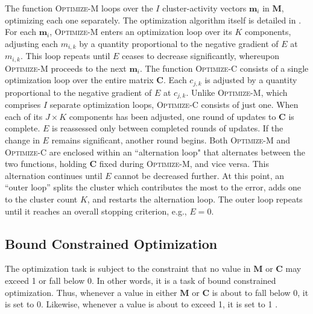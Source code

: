 The function \textsc{Optimize-M} loops over the $I$ cluster-activity vectors $\mathbf{m}_i$ in
$\mathbf{M}$, optimizing each one separately.  The optimization algorithm itself is detailed in \cite{cheng-and-li:2012}.
For each $\mathbf{m}_i$, \textsc{Optimize-M} enters an optimization 
loop over its $K$ components, adjusting each 
$m_{i,k}$ by a
quantity proportional to the negative gradient of $E$ at $m_{i,k}$. 
This loop repeats until $E$
ceases to decrease significantly,
whereupon \textsc{Optimize-M} proceeds to the next $\mathbf{m}_i$.  
The function \textsc{Optimize-C} consists of a single optimization loop over the 
entire matrix
$\mathbf{C}$. Each $c_{j,k}$ is adjusted by a quantity
proportional to the negative gradient of $E$ at $c_{j,k}$.
Unlike \textsc{Optimize-M}, which comprises $I$ separate optimization
loops, \textsc{Optimize-C} consists of just one.
When each of its $J \times K$
components has been adjusted, one round of updates to $\mathbf{C}$ is
complete.  $E$ is reassessed only between completed rounds of
updates. If the change in $E$ remains significant, another round begins.  
Both \textsc{Optimize-M} and \textsc{Optimize-C} are enclosed within 
an ``alternation loop" 
that alternates between the two functions, holding $\mathbf{C}$ fixed
during \textsc{Optimize-M}, and vice versa.
This alternation continues until $E$ cannot be decreased further. At
this point, an ``outer loop''
splits the cluster which contributes the most to the error, adds one
to the cluster count $K$, and restarts the alternation loop. The outer loop
repeats until it reaches an overall stopping criterion, e.g., $E = 0$.
 \subsection{Bound Constrained Optimization}
The optimization task is subject to the constraint %
that no value in $\mathbf{M}$ or $\mathbf{C}$ may exceed 1 or fall below 0. In other words,
it is a task of bound constrained optimization. Thus, whenever a value in either $\mathbf{M}$ or $\mathbf{C}$ is about
to fall below 0, it is set to 0. Likewise, whenever a value is about to exceed 1, it is set to 1
\citep{ni:yuan:1997}.
  
